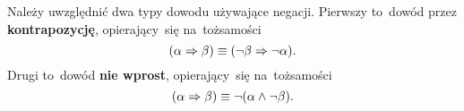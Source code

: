 \documentclass[a4paper,11pt]{article}
\begin{document}



\start {} Należy uwzględnić dwa typy dowodu używające negacji. Pierwszy to~dowód przez \textbf{kontrapozycję}, opierający~się na~tożsamości
\begin{equation}
  \label{eq:Kuratowski-01}
  ( \alpha \Rightarrow \beta ) \equiv ( \neg \beta \Rightarrow \neg \alpha).
\end{equation}
Drugi to~dowód \textbf{nie wprost}, opierający~się na~tożsamości
\begin{equation}
  \label{eq:Kuratowski-02}
  ( \alpha \Rightarrow \beta ) \equiv \neg ( \alpha \land \neg \beta ).
\end{equation}

\vspace{\spaceFour}
\end{document}
